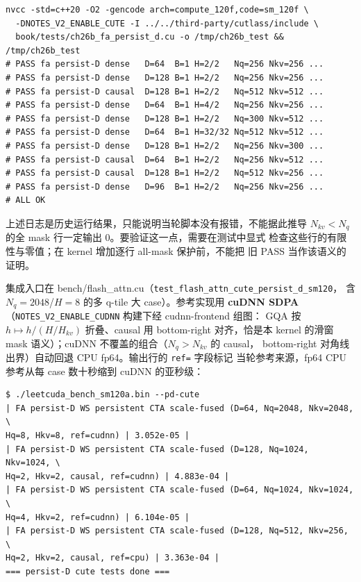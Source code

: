 \begin{lstlisting}[style=console]
nvcc -std=c++20 -O2 -gencode arch=compute_120f,code=sm_120f \
  -DNOTES_V2_ENABLE_CUTE -I ../../third-party/cutlass/include \
  book/tests/ch26b_fa_persist_d.cu -o /tmp/ch26b_test && /tmp/ch26b_test
# PASS fa persist-D dense   D=64  B=1 H=2/2   Nq=256 Nkv=256 ...
# PASS fa persist-D dense   D=128 B=1 H=2/2   Nq=256 Nkv=256 ...
# PASS fa persist-D causal  D=128 B=1 H=2/2   Nq=512 Nkv=512 ...
# PASS fa persist-D dense   D=64  B=1 H=4/2   Nq=256 Nkv=256 ...
# PASS fa persist-D dense   D=128 B=1 H=2/2   Nq=300 Nkv=512 ...
# PASS fa persist-D dense   D=64  B=1 H=32/32 Nq=512 Nkv=512 ...
# PASS fa persist-D dense   D=128 B=1 H=2/2   Nq=256 Nkv=300 ...
# PASS fa persist-D causal  D=64  B=1 H=2/2   Nq=256 Nkv=512 ...
# PASS fa persist-D causal  D=128 B=1 H=2/2   Nq=512 Nkv=256 ...
# PASS fa persist-D dense   D=96  B=1 H=2/2   Nq=256 Nkv=256 ...
# ALL OK
\end{lstlisting}

上述日志是历史运行结果，只能说明当轮脚本没有报错，不能据此推导
$N_{kv}{<}N_q$ 的全 mask 行一定输出 0。要验证这一点，需要在测试中显式
检查这些行的有限性与零值；在 kernel 增加逐行 all-mask 保护前，不能把
旧 PASS 当作该语义的证明。

集成入口在 bench/flash\_attn.cu（\texttt{test\_\allowbreak{}flash\_\allowbreak{}attn\_\allowbreak{}cute\_\allowbreak{}persist\_\allowbreak{}d\_\allowbreak{}sm120}，
含 $N_q{=}2048$/$H{=}8$ 的多 q-tile 大 case）。参考实现用 \textbf{cuDNN SDPA}
（\texttt{NOTES\_\allowbreak{}V2\_\allowbreak{}ENABLE\_CUDNN} 构建下经 cudnn-frontend 组图：
GQA 按 $h\mapsto h/(H/H_{kv})$ 折叠、causal 用 bottom-right 对齐，恰是本
kernel 的滑窗 mask 语义）；cuDNN 不覆盖的组合（$N_q>N_{kv}$ 的 causal，
bottom-right 对角线出界）自动回退 CPU fp64。输出行的 \texttt{ref=} 字段标记
当轮参考来源，fp64 CPU 参考从每 case 数十秒缩到 cuDNN 的亚秒级：

\begin{lstlisting}[style=console]
$ ./leetcuda_bench_sm120a.bin --pd-cute
| FA persist-D WS persistent CTA scale-fused (D=64, Nq=2048, Nkv=2048, \
Hq=8, Hkv=8, ref=cudnn) | 3.052e-05 |
| FA persist-D WS persistent CTA scale-fused (D=128, Nq=1024, Nkv=1024, \
Hq=2, Hkv=2, causal, ref=cudnn) | 4.883e-04 |
| FA persist-D WS persistent CTA scale-fused (D=64, Nq=1024, Nkv=1024, \
Hq=4, Hkv=2, ref=cudnn) | 6.104e-05 |
| FA persist-D WS persistent CTA scale-fused (D=128, Nq=512, Nkv=256, \
Hq=2, Hkv=2, causal, ref=cpu) | 3.363e-04 |
=== persist-D cute tests done ===
\end{lstlisting}

